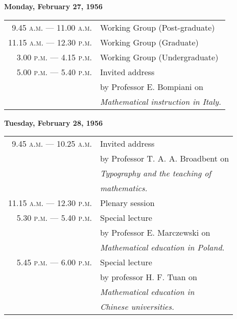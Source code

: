 \begin{center}
{\bf Monday, February 27, 1956}
\end{center}
\begin{longtable}[l]{r@{\;\;}l}
9.45 \textsc{a.m.} --- 11.00 \textsc{a.m.} & Working Group (Post-graduate)\\[6pt]
11.15 \textsc{a.m.} --- 12.30 \textsc{p.m.} & Working Group (Graduate)\\[6pt]
3.00 \textsc{p.m.} --- 4.15 \textsc{p.m.} & Working Group (Undergraduate)\\[6pt]
5.00 \textsc{p.m.} --- 5.40 \textsc{p.m.} & Invited address\\
       & by Professor E. Bompiani on\\
       & {\em Mathematical instruction in Italy.}
\end{longtable}

\begin{center}
{\bf Tuesday, February 28, 1956}
\end{center}
\begin{longtable}[l]{r@{\;\;}l}
9.45 \textsc{a.m.} --- 10.25 \textsc{a.m.} & Invited address\\
         & by Professor T. A. A. Broadbent on\\
         & {\em Typography and the teaching of}\\
         & {\em mathematics.}\\[6pt]
11.15 \textsc{a.m.} --- 12.30 \textsc{p.m.} & Plenary session\\[6pt]
5.30 \textsc{p.m.} --- 5.40 \textsc{p.m.} & Special lecture\\
           & by Professor E. Marczewski on\\
           & {\em Mathematical education in Poland.}\\[6pt]
5.45 \textsc{p.m.} --- 6.00 \textsc{p.m.} & Special lecture\\
        & by professor H. F. Tuan on\\
        & {\em Mathematical education in}\\
        & {\em Chinese universities.}
\end{longtable}
